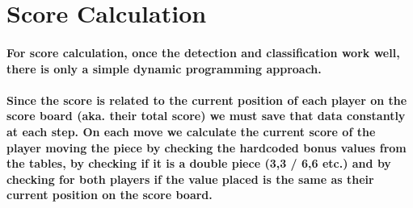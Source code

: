 \documentclass[12pt]{article}
\begin{document}
    \section{Score Calculation}\label{sec:score-calculation}

    \paragraph{For score calculation, once the detection and classification work well, there is only a simple dynamic programming approach.}

    \paragraph{Since the score is related to the current position of each player on the score board (aka. their total score) we must save that data constantly at each step. On each move we calculate the current score of the player moving the piece by checking the hardcoded bonus values from the tables, by checking if it is a double piece (3,3 / 6,6 etc.) and by checking for both players if the value placed is the same as their current position on the score board.}
\end{document}
